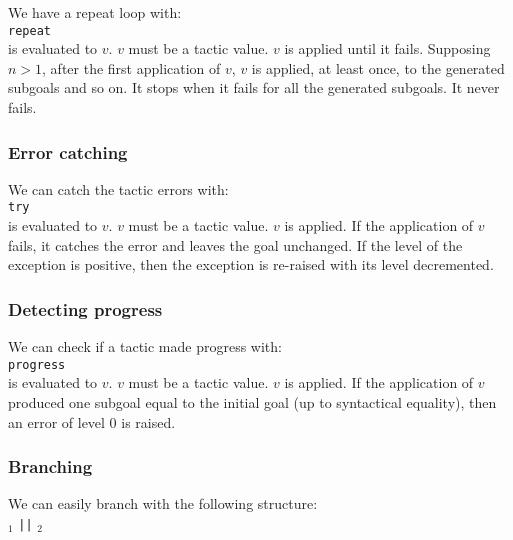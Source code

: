 We have a repeat loop with:\\

{\tt repeat} {\tacexpr}\\

{\tacexpr} is evaluated to $v$. $v$ must be a tactic value. $v$ is
applied until it fails. Supposing $n>1$, after the first application
of $v$, $v$ is applied, at least once, to the generated subgoals and
so on. It stops when it fails for all the generated subgoals. It never
fails.

\subsubsection{Error catching}

We can catch the tactic errors with:\\

{\tt try} {\tacexpr}\\

{\tacexpr} is evaluated to $v$. $v$ must be a tactic value. $v$ is
applied. If the application of $v$ fails, it catches the error and
leaves the goal unchanged. If the level of the exception is positive,
then the exception is re-raised with its level decremented.

\subsubsection{Detecting progress}

We can check if a tactic made progress with:\\

{\tt progress} {\tacexpr}\\

{\tacexpr} is evaluated to $v$. $v$ must be a tactic value. $v$ is
applied. If the application of $v$ produced one subgoal equal to the
initial goal (up to syntactical equality), then an error of level 0 is
raised. 

\ErrMsg {}


\subsubsection{Branching}
\tacindex{||}

We can easily branch with the following structure:\\

{\tacexpr}$_1$ {\tt ||} {\tacexpr}$_2$\\

